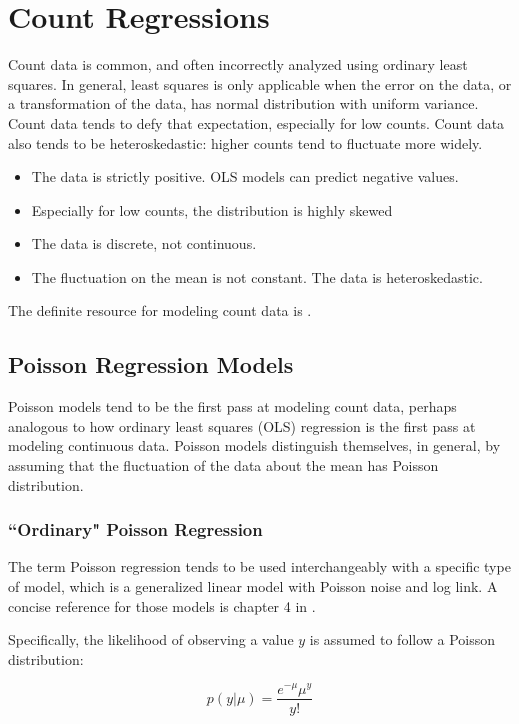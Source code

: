 \section{Count Regressions}

Count data is common, and often incorrectly analyzed using ordinary least squares. In general, least squares is only applicable when the error on the data, or a transformation of the data, has normal distribution with uniform variance. Count data tends to defy that expectation, especially for low counts. Count data also tends to be heteroskedastic: higher counts tend to fluctuate more widely.

\begin{itemize}
\item The data is strictly positive. OLS models can predict negative values.
\item Especially for low counts, the distribution is highly skewed
\item The data is discrete, not continuous.
\item The fluctuation on the mean is not constant. The data is heteroskedastic. 
\end{itemize}

The definite resource for modeling count data is .


\subsection{Poisson Regression Models}
Poisson models tend to be the first pass at modeling count data, perhaps analogous to how ordinary least squares (OLS) regression is the first pass at modeling continuous data. Poisson models distinguish themselves, in general, by assuming that the fluctuation of the data about the mean has Poisson distribution.


\subsubsection{``Ordinary" Poisson Regression}
The term Poisson regression tends to be used interchangeably with a specific type of model, which is a generalized linear model with Poisson noise and log link. A concise reference for those models is chapter 4 in .

Specifically, the likelihood of observing a value $y$ is assumed to follow a Poisson distribution:

\begin{equation}
p(y|\mu) = \frac{e^{-\mu} \mu^{y}}{y!}
\end{equation}

